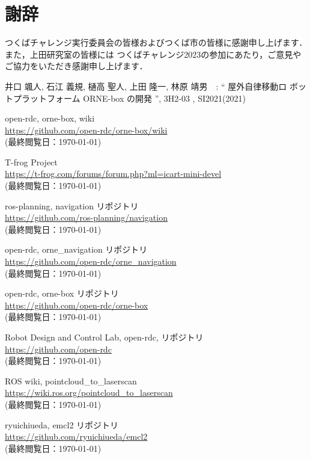 \documentclass[twocolumn, 9pt]{jsproceedings}
\begin{document}
\section*{謝辞}
つくばチャレンジ実行委員会の皆様およびつくば市の皆様に感謝申し上げます．また，上田研究室の皆様には
つくばチャレンジ2023の参加にあたり，ご意見やご協力をいただき感謝申し上げます．\\


\footnotesize
\begin{thebibliography}{99}

井口 颯人, 石江 義規, 樋高 聖人, 上田 隆一, 林原 靖男　: “ 屋外自律移動ロ
ボットプラットフォーム ORNE-box の開発 ”, 3H2-03 , SI2021(2021)

open-rdc, orne-box, wiki\\
\url{https://github.com/open-rdc/orne-box/wiki}\\
(最終閲覧日：\today)

T-frog Project\\
\url{https://t-frog.com/forums/forum.php?ml=icart-mini-devel}\\
(最終閲覧日：\today)

ros-planning, navigation リポジトリ\\
\url{https://github.com/ros-planning/navigation}\\
(最終閲覧日：\today)

open-rdc, orne\_navigation リポジトリ\\
\url{https://github.com/open-rdc/orne_navigation}\\
(最終閲覧日：\today)

open-rdc, orne-box リポジトリ\\
\url{https://github.com/open-rdc/orne-box}\\
(最終閲覧日：\today)

Robot Design and Control Lab, open-rdc, リポジトリ\\
\url{https://github.com/open-rdc}\\
(最終閲覧日：\today)

ROS wiki, pointcloud\_to\_laserscan\\
\url{https://wiki.ros.org/pointcloud_to_laserscan}\\
(最終閲覧日：\today)

ryuichiueda, emcl2 リポジトリ\\
\url{https://github.com/ryuichiueda/emcl2}\\
(最終閲覧日：\today)


\end{thebibliography}
\end{document}
